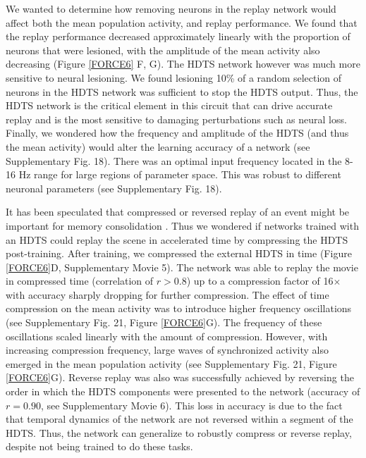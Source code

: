 \documentclass[11pt]{article} %
\begin{document}

We wanted to determine how removing neurons in the replay network would affect both the mean population activity, and replay performance. We found that the replay performance decreased approximately linearly with the proportion of neurons that were lesioned, with the amplitude of the mean activity also decreasing (Figure \ref{FORCE6} F, G).  The HDTS network however was much more sensitive to neural lesioning.  We found lesioning 10\% of a random selection of neurons in the HDTS network was sufficient to stop the HDTS output.   Thus, the HDTS network is the critical element in this circuit that can drive accurate replay and is the most sensitive to damaging perturbations such as neural loss.   Finally, we wondered how the frequency and amplitude of the HDTS (and thus the mean activity) would alter the learning accuracy of a network (see Supplementary Fig. 18).   There was an optimal input frequency located in the 8-16 Hz range for large regions of parameter space.  This was robust to different neuronal parameters (see Supplementary Fig. 18).  


It has been speculated that compressed or reversed replay of an event might be important for memory consolidation \cite{Euston,reversereplay}.  Thus we wondered if networks trained with an HDTS could replay the scene in accelerated time by compressing the HDTS post-training.  After training, we compressed the external HDTS in time (Figure \ref{FORCE6}D, Supplementary Movie 5).  The network was able to replay the movie in compressed time  (correlation of $r>0.8$) up to a compression factor of 16$\times$ with accuracy sharply dropping for further compression.  The effect of time compression on the mean activity was to introduce higher frequency oscillations (see Supplementary Fig. 21, Figure \ref{FORCE6}G).  The frequency of these oscillations scaled linearly with the amount of compression.  However, with increasing compression frequency, large waves of synchronized activity also emerged in the mean population activity (see Supplementary Fig. 21, Figure \ref{FORCE6}G).   Reverse replay was also was successfully achieved by reversing the order in which the HDTS components were presented to the network (accuracy of $r=0.90$, see Supplementary Movie 6).  This loss in accuracy is due to the fact that temporal dynamics of the network are not reversed within a segment of the HDTS.  Thus, the network can generalize to robustly compress or reverse replay, despite not being trained to do these tasks. 
\end{document}
